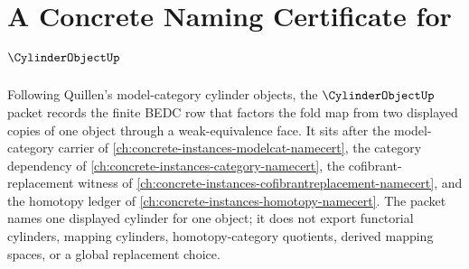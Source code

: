 \chapter{A Concrete Naming Certificate for $\CylinderObjectUp$}
\label{ch:concrete-instances-cylinder-object-namecert}

Following Quillen's model-category cylinder objects, the $\CylinderObjectUp$ packet records the finite BEDC row that factors the fold map from two displayed copies of one object through a weak-equivalence face. It sits after the model-category carrier of \autoref{ch:concrete-instances-modelcat-namecert}, the category dependency of \autoref{ch:concrete-instances-category-namecert}, the cofibrant-replacement witness of \autoref{ch:concrete-instances-cofibrantreplacement-namecert}, and the homotopy ledger of \autoref{ch:concrete-instances-homotopy-namecert}. The packet names one displayed cylinder for one object; it does not export functorial cylinders, mapping cylinders, homotopy-category quotients, derived mapping spaces, or a global replacement choice.

